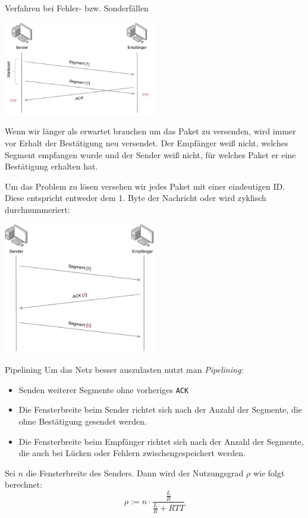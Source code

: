 \begin{bonus}{Verfahren bei Fehler- bzw. Sonderfällen}
    \begin{center}
        \includegraphics[width=0.5\textwidth]{includes/figures/bonus_arq_error.pdf}
    \end{center}

    Wenn wir länger als erwartet brauchen um das Paket zu versenden, wird immer vor Erhalt der Bestätigung neu versendet.
    Der Empfänger weiß nicht, welches Segment empfangen wurde und der Sender weiß nicht, für welches Paket er eine Bestätigung erhalten hat.

    Um das Problem zu lösen versehen wir jedes Paket mit einer eindeutigen ID.
    Diese entspricht entweder dem 1. Byte der Nachricht oder wird zyklisch durchnummeriert:

    \begin{center}
        \includegraphics[width=0.5\textwidth]{includes/figures/bonus_arq.pdf}
    \end{center}
\end{bonus}

\begin{defi}{Pipelining}
    Um das Netz besser auszulasten nutzt man \emph{Pipelining}:
    \begin{itemize}
        \item Senden weiterer Segmente ohne vorheriges \texttt{ACK}
        \item Die Fensterbreite beim Sender richtet sich nach der Anzahl der Segmente, die ohne Bestätigung gesendet werden.
        \item Die Fensterbreite beim Empfänger richtet sich nach der Anzahl der Segmente, die auch bei Lücken oder Fehlern zwischengespeichert werden.
    \end{itemize}

    Sei $n$ die Fensterbreite des Senders.
    Dann wird der Nutzungsgrad $\rho$ wie folgt berechnet:
    \[
        \rho := n \cdot \frac{\frac{L}{R}}{\frac{L}{R} + RTT}
    \]
\end{defi}

